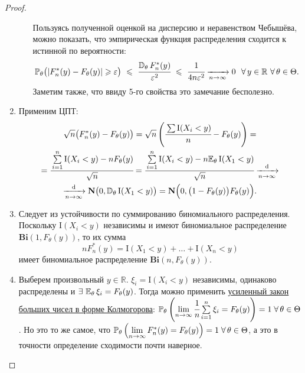\begin{proof}
\begin{enumerate}
\begin{enumerate}[label={\arabic*)}]
                \begin{rmrk}
                    Пользуясь полученной оценкой на дисперсию и неравенством Чебышёва, можно показать, что эмпирическая функция распределения сходится к истинной по вероятности:
                    \begin{equation*}
                        \mathbb{P}_{\theta}\bigl(|F_n^*(y) - F_{\theta}(y)| \geqslant \varepsilon \bigr) ~\leqslant~ \cfrac{\mathbb{D}_{\theta}\, F_n^*(y)}{\varepsilon^2} ~\leqslant~ \cfrac{1}{4n\varepsilon^2} \xrightarrow[n \to \infty]{} 0 ~~\forall \,y \in \mathbb{R} ~ \forall \, \theta \in \Theta.
                    \end{equation*}
                    Заметим также, что ввиду 5-го свойства это замечание бесполезно.
                \end{rmrk}
            \end{enumerate}
        \item 
            Применим ЦПТ:
            \begin{multline*}
                \sqrt{n}\bigl( F_{n}^{*}(y)-F_{\theta}(y) \bigr)
                = \sqrt{n}\left(\cfrac{\sum \mathrm{I}(X_{i}<y)}{n}-F_{\theta}(y)\right) 
                = \\
                = \cfrac{\sum\limits_{i=1}^{n} \mathrm{I}(X_{i}<y)-n F_{\theta}(y)}{\sqrt{n}} 
                = \cfrac{\sum\limits_{i=1}^{n} \mathrm{I}(X_{i}<y)-n \mathbb{E}_{\theta}\,\mathrm{I}(X_{1}<y)}{\sqrt{n}} 
                \xrightarrow[n \to \infty]{\text{d}} \\
                \xrightarrow[n \to \infty]{\text{d}} \mathbf{N}\bigl(0, \mathbb{D}_{\theta}\,\mathrm{I}(X_{1}<y)\bigr)
                = \mathbf{N}\Bigl(0, \bigl(1-F_{\theta}(y)\bigr)F_{\theta}(y)\Bigr).
            \end{multline*}
        \item 
            Следует из устойчивости по суммированию биномиального распределения. 
            Поскольку $\mathrm{I}\left(X_{i}<y\right)$ независимы и имеют биномиальное распределение $\mathbf{Bi}(1, F_{\theta}(y))$, то их сумма
            \begin{equation*}
                n F_{n}^{*}(y)=\mathrm{I}\left(X_{1}<y\right)+\ldots+\mathrm{I}\left(X_{n}<y\right)
            \end{equation*}
            имеет биномиальное распределение $\mathbf{Bi}(n, F_{\theta}(y))$.
            
        \item 
            Выберем произвольный $y \in \mathbb{R}$. 
            $\xi_i = \mathrm{I}(X_i < y)$ независимы, одинаково распределены и $\exists~\mathbb{E}_{\theta}\, \xi_i = F_{\theta}(y)$.
            Тогда можно применить \hyperlink{SLLN}{усиленный закон больших чисел в форме Колмогорова}: ${\mathbb{P}_{\theta}\left(\lim\limits_{n \to \infty} \cfrac{1}{n} \sum\limits_{i = 1}^{n}\xi_i = F_{\theta}(y)\right) = 1} \; \forall \, \theta \in \Theta$. 
            Но это то же самое, что $\mathbb{P}_{\theta}\left({\lim\limits_{n \to \infty} F_n^*(y) = F_{\theta}(y)}\right) = 1 \; \forall \, \theta \in \Theta$, а это в точности определение сходимости почти наверное.
    \end{enumerate}  
\end{proof}
